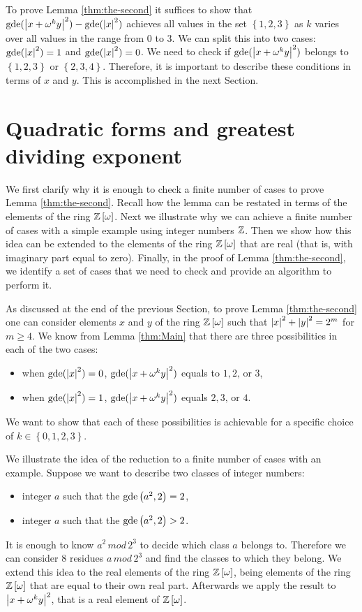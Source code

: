 \documentclass[english,journal]{extarticle}
\theoremstyle{plain}
\theoremstyle{plain}
\theoremstyle{plain}
\theoremstyle{definition}
\theoremstyle{plain}
\theoremstyle{plain}
\begin{document}
To prove Lemma \ref{thm:the-second} it suffices to show that
$\mathbf{\mathrm{gde}}(\left|x+\omega^{k}y\right|^{2})-\mathbf{\mathrm{gde}}(\left|x\right|^{2})$ achieves all values
in the set $\left\{ 1,2,3\right\} $ as $k$ varies over all values
in the range from $0$ to $3$.  We can split this into two cases:
$\mathbf{\mathrm{gde}}(\left|x\right|^{2})=1$ and $\mathbf{\mathrm{gde}}(\left|x\right|^{2})=0$. We need to check
if $\mathbf{\mathrm{gde}}(\left|x+\omega^{k}y\right|^{2})$ belongs to $\left\{ 1,2,3\right\} $
or $\left\{ 2,3,4\right\}$.  Therefore, it is important to describe
these conditions in terms of $x$ and $y$.  This is accomplished in the next Section.


\section{\label{sec:Bilinear-forms-and}Quadratic forms and greatest dividing
exponent} \label{sec:5}
\noindent
We first clarify why it is enough to check a finite number
of cases to prove Lemma \ref{thm:the-second}.  Recall
how the lemma can be restated in terms of the elements of the ring $\mathbb{Z}\left[\omega\right]$.
Next we illustrate why we can achieve a finite number of cases with a simple
example using integer numbers $\mathbb{Z}$. Then we show how this idea can be extended
to the elements of the ring $\mathbb{Z}\left[\omega\right]$ that are real (that is, with imaginary part equal to zero).  Finally, in the proof
of Lemma \ref{thm:the-second}, we identify a set of cases that we
need to check and provide an algorithm to perform it. 

As discussed at the end of the previous Section, to prove Lemma
\ref{thm:the-second}
one can consider elements $x$ and $y$ of the ring $\mathbb{Z}\left[\omega\right]$ such that $\left|x\right|^{2}+\left|y\right|^{2}=2^{m}$
for $m\ge 4$.  We know from Lemma \ref{thm:Main} that there are three possibilities
in each of the two cases: 
\begin{itemize}
\item when $\mathbf{\mathrm{gde}}(\left|x\right|^{2})=0$, $\mathbf{\mathrm{gde}}(\left|x+\omega^{k}y\right|^{2})$ equals to
$1,2\mbox{, or }3$,
\item when $\mathbf{\mathrm{gde}}(\left|x\right|^{2})=1$, $\mathbf{\mathrm{gde}}(\left|x+\omega^{k}y\right|^{2})$ equals $2,3\mbox{, 
or }4$.
\end{itemize}
We want to show that each of these possibilities is achievable for a specific choice of 
$k\in\left\{ 0,1,2,3\right\}$. 

We illustrate the idea of the reduction to a finite number of cases
with an example.  Suppose we want to describe two classes of integer numbers: 
\begin{itemize}
\item integer $a$ such that the $\mathbf{\mathrm{gde}}\left(a^{2},2\right)=2$,
\item integer $a$ such that the $\mathbf{\mathrm{gde}}\left(a^{2},2\right)>2$.
\end{itemize}
It is enough to know $a^{2}\, mod\,2^{3}$ to decide which class $a$
belongs to. Therefore we can consider $8$ residues $a\, mod\,2^{3}$
and find the classes to which they belong. We extend this
idea to the real elements of the ring $\mathbb{Z}\left[\omega\right]$, being elements of the ring $\mathbb{Z}\left[\omega\right]$
that are equal to their own real part.  Afterwards we apply the result
to $\left|x+\omega^{k}y\right|^{2}$, that is a real element of $\mathbb{Z}\left[\omega\right]$. 
\end{document}
